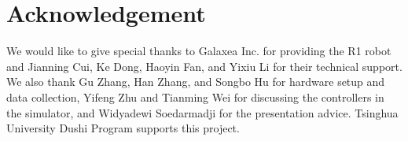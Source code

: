 \section*{Acknowledgement}
We would like to give special thanks to Galaxea Inc. for providing the R1 robot and Jianning Cui, Ke Dong, Haoyin Fan, and Yixiu Li for their technical support. We also thank Gu Zhang, Han Zhang, and Songbo Hu for hardware setup and data collection, Yifeng Zhu and Tianming Wei for discussing the controllers in the simulator, and Widyadewi Soedarmadji for the presentation advice.
Tsinghua University Dushi Program supports this project.